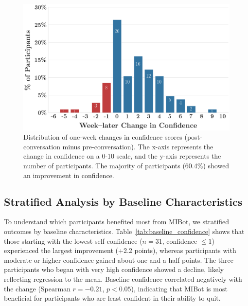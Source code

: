 \begin{figure}[ht]
  \centering
  \includegraphics[width=0.8\linewidth]{fig/2024-11-14-MIV6.3A-2024-11-22-MIV6.3A_ruler_deltas_delta_with_week_later_keep_high_conf_False_change.png}
  \caption[Distribution of Confidence Changes]{Distribution of one-week changes in confidence scores (post-conversation minus pre-conversation). The x-axis represents the change in confidence on a 0-10 scale, and the y-axis represents the number of participants. The majority of participants (60.4\%) showed an improvement in confidence.}
  \label{fig:confidence_change_distribution}
\end{figure}



\subsection*{Stratified Analysis by Baseline Characteristics}

To understand which participants benefited most from MIBot, we stratified outcomes by baseline characteristics. Table~\ref{tab:baseline_confidence} shows that those starting with the lowest self-confidence ($n=31$, confidence $\leq 1$) experienced the largest improvement (+2.2 points), whereas participants with moderate or higher confidence gained about one and a half points. The three participants who began with very high confidence showed a decline, likely reflecting regression to the mean. Baseline confidence correlated negatively with the change (Spearman $r=-0.21$, $p<0.05$), indicating that MIBot is most beneficial for participants who are least confident in their ability to quit.

